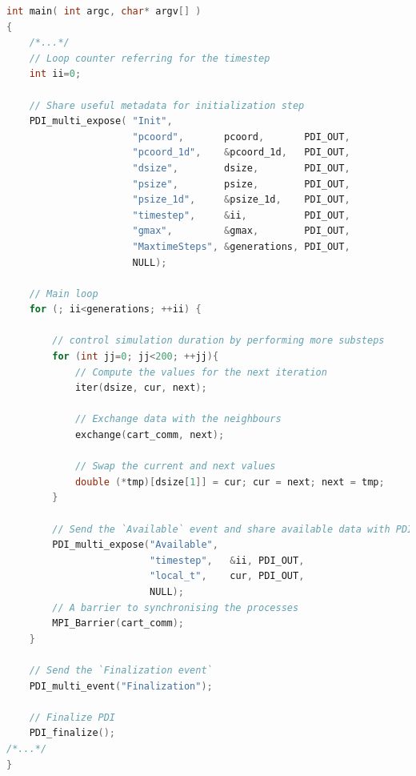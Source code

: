 \begin{lstlisting}[float, label=list:simulation, language=c, caption= Simulation main loop]
int main( int argc, char* argv[] )
{
    /*...*/
    // Loop counter referring for the timestep 
    int ii=0;

    // Share useful metadata for initialization step
    PDI_multi_expose( "Init",
                      "pcoord",       pcoord,       PDI_OUT,
                      "pcoord_1d",    &pcoord_1d,   PDI_OUT,
                      "dsize",        dsize,        PDI_OUT,
                      "psize",        psize,        PDI_OUT, 
                      "psize_1d",     &psize_1d,    PDI_OUT,
                      "timestep",     &ii,          PDI_OUT, 
                      "gmax",         &gmax,        PDI_OUT,
                      "MaxtimeSteps", &generations, PDI_OUT,
                      NULL);

    // Main loop
    for (; ii<generations; ++ii) {

        // control simulation duration by performing more substeps
        for (int jj=0; jj<200; ++jj){       
            // Compute the values for the next iteration
            iter(dsize, cur, next);

            // Exchange data with the neighbours
            exchange(cart_comm, next);

            // Swap the current and next values
            double (*tmp)[dsize[1]] = cur; cur = next; next = tmp;
        }

        // Send the `Available` event and share available data with PDI 
        PDI_multi_expose("Available",
                         "timestep",   &ii, PDI_OUT,
                         "local_t",    cur, PDI_OUT,
                         NULL);
        // A barrier to synchronising the processes
        MPI_Barrier(cart_comm);
    }

    // Send the `Finalization event` 
    PDI_multi_event("Finalization"); 

    // Finalize PDI
    PDI_finalize();
/*...*/
}
\end{lstlisting}

